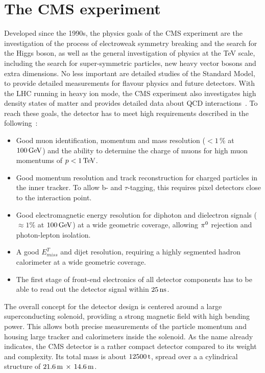 \section{The \acf{CMS} experiment}\label{sec:CMS}
Developed since the 1990s, the physics goals of the \ac{CMS} experiment are the investigation of the process of electroweak symmetry breaking and the search for the Higgs boson, as well as the general investigation of physics at the TeV scale, including the search for super-symmetric particles, new heavy vector bosons and extra dimensions. No less important are detailed studies of the Standard Model, to provide detailed measurements for flavour physics and future detectors. With the \ac{LHC} running in heavy ion mode, the \ac{CMS} experiment also investigates high density states of matter and provides detailed data about \ac{QCD} interactions~\cite{Bay05}. To reach these goals, the detector has to meet high requirements described in the following~\cite{C+08}:
\begin{itemize}
\item Good muon identification, momentum and mass resolution ($<1\,\%$ at $100\,\rm{GeV}$) and the ability to determine the charge of muons for high muon momentums of $p<1\,\rm{TeV}$.
\item Good momentum resolution and track reconstruction for charged particles in the inner tracker. To allow b- and $\tau$-tagging, this requires pixel detectors close to the interaction point.
\item Good electromagnetic energy resolution for diphoton and dielectron signals ($\approx 1\%$ at $100\,\rm{GeV}$) at a wide geometric coverage, allowing $\rm{\pi}^0$ rejection and photon-lepton isolation.
\item A good $E^T_{miss}$ and dijet resolution, requiring a highly segmented hadron calorimeter at a wide geometric coverage.
\item The first stage of front-end electronics of all detector components has to be able to read out the detector signal within $25\,\rm{ns}$.
\end{itemize}
The overall concept for the detector design is centered around a large superconducting solenoid, providing a strong magnetic field with high bending power. This allows both precise measurements of the particle momentum and housing large tracker and calorimeters inside the solenoid. As the name already indicates, the \ac{CMS} detector is a rather compact detector compared to its weight and complexity. Its total mass is about $12500\,\rm{t}$, spread over a a cylindrical structure of $21.6\,\rm{m}\,\times \, 14.6\,\rm{m}$.


